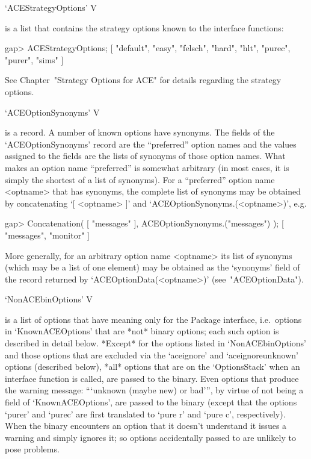\>`ACEStrategyOptions' V

is a {\GAP} list that contains  the  strategy  options  known  to  the
{\ACE} interface functions:

\beginexample
gap> ACEStrategyOptions;
[ "default", "easy", "felsch", "hard", "hlt", "purec", "purer", "sims" ]

\endexample

See Chapter~"Strategy Options  for  ACE"  for  details  regarding  the
{\ACE} strategy options.

\nolabel

\>`ACEOptionSynonyms' V

is a {\GAP} record. A number of known {\ACE}  options  have  synonyms.
The fields of the `ACEOptionSynonyms'  record  are  the  ``preferred''
option names and the values assigned to the fields are  the  lists  of
synonyms  of  those  option  names.  What   makes   an   option   name
``preferred'' is somewhat arbitrary (in most cases, it is  simply  the
shortest of a list of  synonyms).  For  a  ``preferred''  option  name
<optname> that has synonyms, the complete  list  of  synonyms  may  be
obtained     by     concatenating     `[     <optname>     ]'      and
`ACEOptionSynonyms.(<optname>)', e.g.

\beginexample
gap> Concatenation( [ "messages" ], ACEOptionSynonyms.("messages") );
[ "messages", "monitor" ]

\endexample

More generally, for an arbitrary option name  <optname>  its  list  of
synonyms (which may be a list of one element) may be obtained  as  the
`synonyms' field of the record returned by  `ACEOptionData(<optname>)'
(see~"ACEOptionData").


\>`NonACEbinOptions' V

is a {\GAP} list of options that have  meaning  only  for  the  {\ACE}
Package interface, i.e.~options in `KnownACEOptions'  that  are  *not*
{\ACE} binary options; each such option is described in detail  below.
*Except* for  the  options  listed  in  `NonACEbinOptions'  and  those
options that are excluded via the `aceignore'  and  `aceignoreunknown'
options  (described  below),   *all*   options   that   are   on   the
`OptionsStack' when an {\ACE} interface function is called, are passed
to the {\ACE} binary. Even options that produce the  warning  message:
```unknown (maybe new) or bad''', by virtue of not being  a  field  of
`KnownACEOptions', are passed to the {\ACE} binary  (except  that  the
options `purer' and `purec' are first translated to `pure r' and `pure
c', respectively). When the {\ACE} binary encounters an option that it
doesn't understand it issues a  warning  and  simply  ignores  it;  so
options accidentally passed to {\ACE} are unlikely to pose problems.

